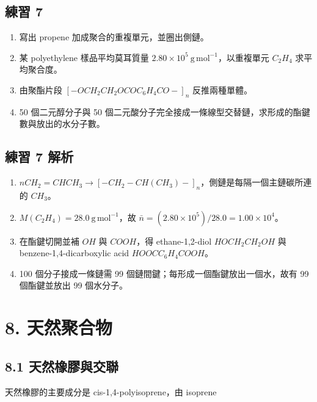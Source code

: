 \documentclass[11pt,a4paper]{article}
\providecommand{\tightlist}{%
  \setlength{\itemsep}{0pt}\setlength{\parskip}{0pt}}
\begin{document}
\subsection{練習 7}\label{ux7df4ux7fd2-7}

\begin{enumerate}
\def\labelenumi{\arabic{enumi}.}
\tightlist
\item
  寫出 propene 加成聚合的重複單元，並圈出側鏈。
\item
  某 polyethylene 樣品平均莫耳質量 \(2.80\times10^5\ \mathrm{g\,mol^{-1}}\)，以重複單元 \(C_2H_4\) 求平均聚合度。
\item
  由聚酯片段 \([-OCH_2CH_2OCOC_6H_4CO-]_n\) 反推兩種單體。
\item
  50 個二元醇分子與 50 個二元酸分子完全接成一條線型交替鏈，求形成的酯鍵數與放出的水分子數。
\end{enumerate}

\subsection{練習 7 解析}\label{ux7df4ux7fd2-7-ux89e3ux6790}

\begin{enumerate}
\def\labelenumi{\arabic{enumi}.}
\tightlist
\item
  \(nCH_2=CHCH_3\rightarrow[-CH_2-CH(CH_3)-]_n\)，側鏈是每隔一個主鏈碳所連的 \(CH_3\)。
\item
  \(M(C_2H_4)=28.0\ \mathrm{g\,mol^{-1}}\)，故 \(\bar n=(2.80\times10^5)/28.0=1.00\times10^4\)。
\item
  在酯鍵切開並補 \(OH\) 與 \(COOH\)，得 ethane-1,2-diol \(HOCH_2CH_2OH\) 與 benzene-1,4-dicarboxylic acid \(HOOCC_6H_4COOH\)。
\item
  100 個分子接成一條鏈需 99 個鏈間鍵；每形成一個酯鍵放出一個水，故有 99 個酯鍵並放出 99 個水分子。
\end{enumerate}

\section{8. 天然聚合物}\label{ux5929ux7136ux805aux5408ux7269}

\subsection{8.1 天然橡膠與交聯}\label{ux5929ux7136ux6a61ux81a0ux8207ux4ea4ux806f}

天然橡膠的主要成分是 cis-1,4-polyisoprene，由 isoprene
\end{document}
